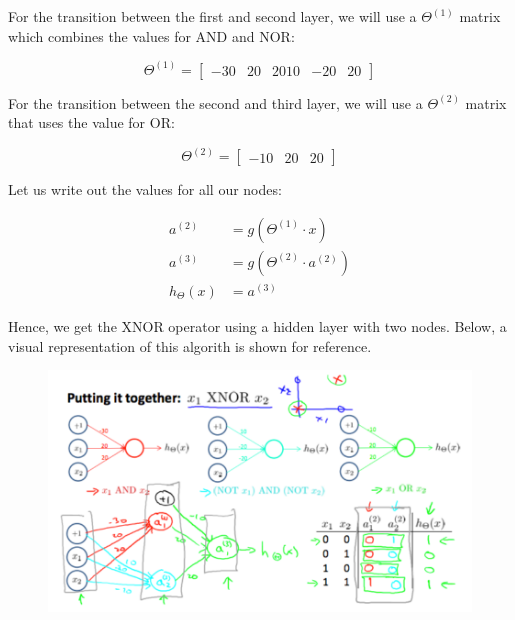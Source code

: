     \noindent For the transition between the first and second layer, we will use a $\Theta^{(1)}$ matrix
    which combines the values for AND and NOR:

    \begin{equation*}
        \Theta^{(1)} =
        \begin{bmatrix}
            -30 & 20 & 2010 & -20 & 20
        \end{bmatrix}
    \end{equation*}

    \noindent For the transition between the second and third layer, we will use a $\Theta^{(2)}$ matrix
    that uses the value for OR:

    \begin{equation*}
        \Theta^{(2)} =
        \begin{bmatrix}
            -10 & 20 & 20
        \end{bmatrix}
    \end{equation*}

    \noindent Let us write out the values for all our nodes:

    \begin{align*}
        a^{(2)}         &= g\left(\Theta^{(1)}\cdot x\right) \\
        a^{(3)}         &= g\left(\Theta^{(2)}\cdot a^{(2)}\right) \\
        h_\Theta (x)    &= a^{(3)}
    \end{align*}

    \noindent Hence, we get the XNOR operator using a hidden layer with two nodes. Below, a visual
    representation of this algorith is shown for reference.

    \begin{figure}[hbt!]
        \centering
        \includegraphics[scale=0.75]{Resources/XNOR}
    \end{figure}

